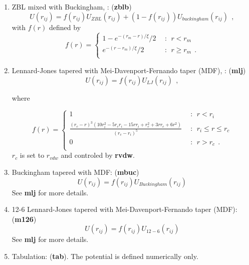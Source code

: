 \begin{enumerate}
\item ZBL mixed with Buckingham, \cite{trachenko2003}: ({\bf zblb})
  \begin{equation}
    U\left(r_{ij}\right) = f\left(r_{ij}\right)U_{ZBL}\left(r_{ij}\right)+\left(1-f\left(r_{ij}\right)\right)U_{buckingham}\left(r_{ij}\right)~~,
  \end{equation}
  with $f\left(r\right)$ defined by
  \begin{equation*}
     f\left(r\right) = \left\{
       \begin{array}{ll}
         1-e^{-\left(r_m-r\right)/\xi}/2 & ~~:~~ r<r_m \\
         e^{-\left(r-r_m\right)/\xi}/2 & ~~:~~ r\geq r_m~~. \\
       \end{array}
       \right.
  \end{equation*}
\item Lennard-Jones tapered with Mei-Davenport-Fernando taper (MDF), \cite{Raiteri2010}: ({\bf mlj})
  \begin{equation}
    U\left(r_{ij}\right) = f\left(r_{ij}\right)U_{LJ}\left(r_{ij}\right)~~,
  \end{equation}

  where

    \begin{equation}
    f(r)=
     \begin{cases}
       1 & ~~:~~ r<r_i \\
   \frac{\left(r_c-r\right)^3\left(10r_i^2-5r_cr_i-15rr_i+r_c^2+3rr_c+6r^2\right)}{\left(r_c-r_i\right)^5} & ~~:~~ r_i \leq r \leq r_c \\
       0 & ~~:~~ r>r_c~~.\\
     \end{cases}
   \end{equation}
  $r_c$ is set to $r_{vdw}$ and controled by {\bf rvdw}.
\item Buckingham tapered with MDF: ({\bf mbuc})
  \begin{equation}
    U\left(r_{ij}\right) = f\left(r_{ij}\right)U_{Buckingham}\left(r_{ij}\right)
  \end{equation}
  See {\bf mlj} for more details.
\item 12-6 Lennard-Jones tapered with Mei-Davenport-Fernando taper (MDF): ({\bf m126})
  \begin{equation}
    U\left(r_{ij}\right) = f\left(r_{ij}\right)U_{12-6}\left(r_{ij}\right)
  \end{equation}
  See {\bf mlj} for more details.
\item Tabulation:  ({\bf tab}).  The potential is defined
numerically only.
\end{enumerate}

